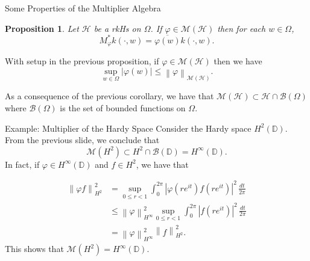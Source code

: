 \documentclass{beamer}
\newtheorem{proposition}[theorem]{Proposition}
\newcommand{\D}{\mathbb D}
\renewcommand{\le}{\leqslant}
\newcommand{\calB}{{\mathcal B}}
\newcommand{\calH}{{\mathcal H}}
\newcommand{\calM}{{\mathcal M}}
\newcommand{\norm}[1]{\left\lVert #1 \right\rVert}
\newcommand{\abs}[1]{\left\lvert #1 \right\rvert}
\begin{document}
\begin{frame}{Some Properties of the Multiplier Algebra}
\begin{proposition}
Let $\calH$ be a rkHs on $\Omega$. If $\varphi \in \calM \left( \calH \right)$ then for each $w\in \Omega$, 
\begin{equation*}
M_{\varphi}^{*} k\left( \cdot , w \right) = \overline{\varphi (w)} k\left( \cdot , w \right).
\end{equation*}
\end{proposition}
\pause
\begin{corollary}
With setup in the previous proposition, if $\varphi \in \calM \left( \calH \right)$ then we have
\begin{equation*}
\sup_{w\in \Omega} \abs{\varphi (w)} \le \norm{\varphi}_{\calM \left( \calH \right)}.
\end{equation*}
\label{cor:boundedness-of-multiplier}
\end{corollary}
\pause
\label{prop:adjoint-eigenvalue}
As a consequence of the previous corollary, we have that $\calM \left( \calH \right) \subset \calH \cap \calB \left( \Omega \right)$ where $\calB \left( \Omega \right)$ is the set of bounded functions on $\Omega$.
\end{frame}

\begin{frame}{Example: Multiplier of the Hardy Space}
Consider the Hardy space $H^{2} \left( \D \right)$. From the previous slide, we conclude that 
\begin{equation*}
\calM \left( H^{2} \right) \subset H^{2} \cap \calB \left( \D \right) = H^{\infty} \left( \D \right).
\end{equation*}
\pause
In fact, if $\varphi \in H^{\infty} \left( \D \right)$ and $f \in H^{2}$, we have that 

\begin{align*}
    \norm{\varphi f}_{H^{2}}^{2} &= \sup_{0\le r < 1} \int_{0}^{2\pi} \abs{\varphi \left( re^{it} \right) f \left( re^{it} \right)}^{2} \, \frac{dt}{2\pi} \\
    &\le \norm{\varphi}_{H^{\infty}}^{2} \sup_{0 \le r < 1} \int_{0}^{2\pi} \abs{f\left( re^{it} \right)}^{2} \, \frac{dt}{2\pi} \\
&= \norm{\varphi}_{H^{\infty}}^{2} \norm{f}_{H^{2}}^{2}.
\end{align*}
This shows that $\calM \left( H^{2} \right) = H^{\infty} \left( \D \right)$.
\end{frame}
\end{document}
